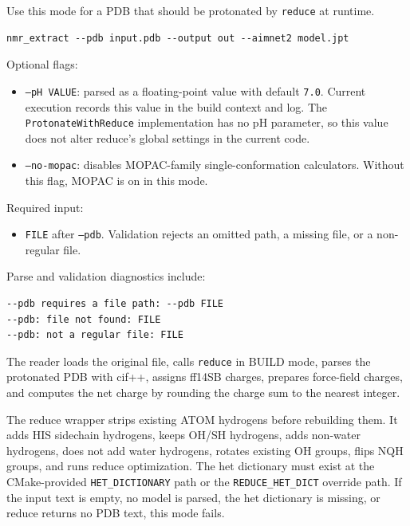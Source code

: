 \documentclass[11pt]{article}
\begin{document}
Use this mode for a PDB that should be protonated by \texttt{reduce} at runtime.

\begin{lstlisting}
nmr_extract --pdb input.pdb --output out --aimnet2 model.jpt
\end{lstlisting}

Optional flags:

\begin{itemize}
\item \texttt{--pH VALUE}: parsed as a floating-point value with default
  \texttt{7.0}. Current execution records this value in the build context and
  log. The \texttt{ProtonateWithReduce} implementation has no pH parameter, so
  this value does not alter reduce's global settings in the current code.
\item \texttt{--no-mopac}: disables MOPAC-family single-conformation
  calculators. Without this flag, MOPAC is on in this mode.
\end{itemize}

Required input:

\begin{itemize}
\item \texttt{FILE} after \texttt{--pdb}. Validation rejects an omitted path,
  a missing file, or a non-regular file.
\end{itemize}

Parse and validation diagnostics include:

\begin{lstlisting}
--pdb requires a file path: --pdb FILE
--pdb: file not found: FILE
--pdb: not a regular file: FILE
\end{lstlisting}

The reader loads the original file, calls \texttt{reduce} in BUILD mode, parses
the protonated PDB with cif++, assigns ff14SB charges, prepares force-field
charges, and computes the net charge by rounding the charge sum to the nearest
integer.

The reduce wrapper strips existing ATOM hydrogens before rebuilding them. It
adds HIS sidechain hydrogens, keeps OH/SH hydrogens, adds non-water hydrogens,
does not add water hydrogens, rotates existing OH groups, flips NQH groups, and
runs reduce optimization. The het dictionary must exist at the CMake-provided
\texttt{HET\_DICTIONARY} path or the \texttt{REDUCE\_HET\_DICT} override path.
If the input text is empty, no model is parsed, the het dictionary is missing,
or reduce returns no PDB text, this mode fails.
\end{document}
